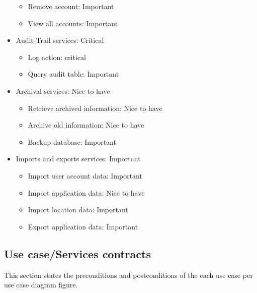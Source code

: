 \documentclass[12pt]{article}
\begin{document}
\begin{itemize}
\begin{itemize}
		\item Remove account: Important
		\item View all accounts: Important
	\end{itemize}
	\item Audit-Trail services: Critical
	\begin{itemize}
		\item Log action: critical
		\item Query audit table: Important
	\end{itemize}
	\item Archival services: Nice to have
	\begin{itemize}
		\item Retrieve archived information: Nice to have
		\item Archive old information: Nice to have
		\item Backup database: Important
	\end{itemize}
	\item Imports and exports services: Important
	\begin{itemize}
		\item Import user account data: Important
		\item Import application data: Nice to have
		\item Import location data: Important
		\item Export application data: Important
	\end{itemize}
	
\end{itemize}


\vspace{0.2in}

\subsection{Use case/Services contracts} %
\vspace{0.2in}

This section states the preconditions and postconditions of the each use case per use case diagram figure. \\
\end{document}
